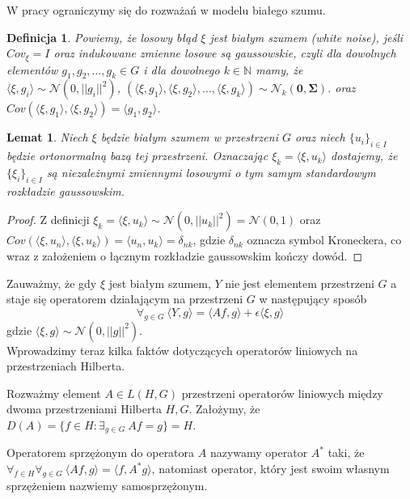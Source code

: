 \documentclass{article}
\newtheorem{df}{Definicja}
\newtheorem{lm}{Lemat}
\begin{document}
W pracy ograniczymy się do rozważań w modelu białego szumu.

\begin{df}
Powiemy, że losowy błąd $\xi$ jest białym szumem (\textit{white noise}), jeśli $Cov_{\xi}=I$ oraz indukowane zmienne losowe są gaussowskie, czyli dla dowolnych elementów $g_1,g_2,\dots,g_k\in G$ i dla dowolnego $k\in \mathbb{N}$ mamy, że $\langle \xi,g_i\rangle\sim \mathcal{N}(0,||g_i||^2)$, $(\langle \xi,g_1\rangle,\langle \xi,g_2\rangle,\dots,\langle \xi,g_k\rangle)\sim\mathcal{N}_k(\pmb{0},\pmb{\Sigma})$. oraz $Cov(\langle \xi,g_1\rangle , \langle \xi , g_2\rangle)=\langle g_1, g_2\rangle$.
\end{df}
\begin{lm}
Niech $\xi$ będzie białym szumem w przestrzeni $G$ oraz niech $\{u_i\}_{i\in I}$ będzie ortonormalną bazą tej przestrzeni. Oznaczając $\xi_k=\langle \xi,u_k\rangle$ dostajemy, że $\{\xi_i\}_{i\in I}$ są niezależnymi zmiennymi losowymi o tym samym standardowym rozkładzie gaussowskim.
\end{lm}
\begin{proof}
Z definicji $\xi_k=\langle \xi,u_k\rangle\sim \mathcal{N}(0,||u_k||^2)=\mathcal{N}(0,1)$ oraz $Cov(\langle \xi, u_n\rangle,\langle \xi, u_k\rangle)=\langle u_n,u_k\rangle=\delta_{nk}$, gdzie $\delta_{nk}$ oznacza symbol Kroneckera, co wraz z założeniem o łącznym rozkładzie gaussowskim kończy dowód.
\end{proof}

Zauważmy, że gdy $\xi$ jest białym szumem, $Y$ nie jest elementem przestrzeni $G$ a staje się operatorem działającym na przestrzeni $G$ w następujący sposób
\begin{displaymath}
\forall_{g\in G}\ \langle Y,g\rangle =\langle Af,g\rangle + \epsilon\langle \xi, g\rangle
\end{displaymath}
gdzie $\langle \xi, g\rangle\sim\mathcal{N}(0,||g||^2)$.\\

Wprowadzimy teraz kilka faktów dotyczących operatorów liniowych na przestrzeniach Hilberta.

Rozważmy element $A\in L(H,G)$ przestrzeni operatorów liniowych między dwoma przestrzeniami Hilberta $H,G$. Założymy, że $D(A)=\{f\in H\colon \exists_{g\in G}\ Af=g\}=H$.

Operatorem sprzężonym do operatora $A$ nazywamy operator $A^*$ taki, że $\forall_{f\in H}\forall_{g\in G}\ \langle Af,g\rangle=\langle f,A^*g\rangle$, natomiast operator, który jest swoim własnym sprzężeniem nazwiemy samosprzężonym.
\end{document}
